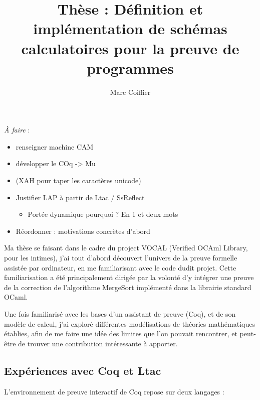 \documentclass[]{article}
\title{Thèse : Définition et implémentation de schémas calculatoires pour la
preuve de programmes}
\author{Marc Coiffier}
\date{}
\providecommand{\tightlist}{%
  \setlength{\itemsep}{0pt}\setlength{\parskip}{0pt}}
\begin{document}
\maketitle

{
\hypersetup{linkcolor=black}
\setcounter{tocdepth}{3}
\tableofcontents
\newpage
}

\emph{À faire} :

\begin{itemize}
\tightlist
\item
  renseigner machine CAM
\item
  développer le COq -\textgreater{} Mu
\item
  (XAH pour taper les caractères unicode)
\item
  Justifier LAP à partir de Ltac / SsReflect

  \begin{itemize}
  \tightlist
  \item
    Portée dynamique pourquoi ? En 1 et deux mots
  \end{itemize}
\item
  Réordonner : motivations concrètes d'abord
\end{itemize}

Ma thèse se faisant dans le cadre du project VOCAL (Verified OCAml
Library, pour les intimes), j'ai tout d'abord découvert l'univers de la
preuve formelle assistée par ordinateur, en me familiarisant avec le
code dudit projet. Cette familiarisation a été principalement dirigée
par la volonté d'y intégrer une preuve de la correction de l'algorithme
MergeSort implémenté dans la librairie standard OCaml.

Une fois familiarisé avec les bases d'un assistant de preuve (Coq), et
de son modèle de calcul, j'ai exploré différentes modélisations de
théories mathématiques établies, afin de me faire une idée des limites
que l'on pouvait rencontrer, et peut-être de trouver une contribution
intéressante à apporter.

\subsection{Expériences avec Coq et
Ltac}\label{expuxe9riences-avec-coq-et-ltac}

L'environnement de preuve interactif de Coq repose sur deux langages :
\end{document}
